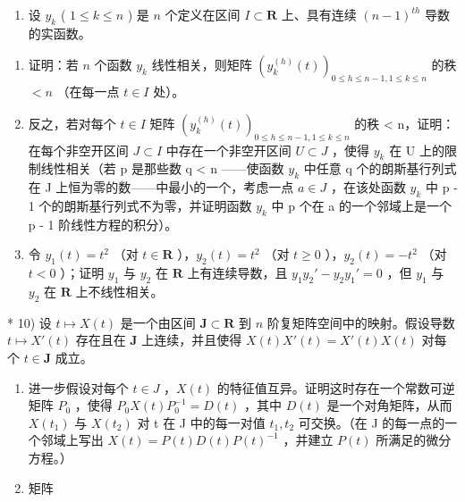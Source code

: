 \begin{enumerate}
\def\labelenumi{\arabic{enumi})}
\setcounter{enumi}{8}
\tightlist
\item
  设 \(y_{k}\) ( \(1 \leqslant k \leqslant n\) ) 是 \(n\) 个定义在区间 \(I \subset \mathbf{R}\) 上、具有连续 \((n - 1)^{th}\) 导数的实函数。
\end{enumerate}

\begin{enumerate}
\def\labelenumi{\alph{enumi})}
\item
  证明：若 \(n\) 个函数 \(y_{k}\) 线性相关，则矩阵 \((y_{k}^{(h)}(t))_{0\leqslant h\leqslant n - 1, 1\leqslant k\leqslant n}\) 的秩 \(< n\) （在每一点 \(t\in I\) 处）。
\item
  反之，若对每个 \(t \in I\) 矩阵 \((y_{k}^{(h)}(t))_{0 \leqslant h \leqslant n-1, 1 \leqslant k \leqslant n}\) 的秩 \textless{} n，证明：在每个非空开区间 \(J \subset I\) 中存在一个非空开区间 \(U \subset J\) ，使得 \(y_{k}\) 在 U 上的限制线性相关（若 p 是那些数 q \textless{} n ——使函数 \(y_{k}\) 中任意 q 个的朗斯基行列式在 J 上恒为零的数——中最小的一个，考虑一点 \(a \in J\) ，在该处函数 \(y_{k}\) 中 p - 1 个的朗斯基行列式不为零，并证明函数 \(y_{k}\) 中 p 个在 a 的一个邻域上是一个 p - 1 阶线性方程的积分）。
\item
  令 \(y_{1}(t) = t^{2}\) （对 \(t \in \mathbf{R}\) ），\(y_{2}(t) = t^{2}\) （对 \(t \geqslant 0\) ），\(y_{2}(t) = -t^{2}\) （对 \(t < 0\) ）；证明 \(y_{1}\) 与 \(y_{2}\) 在 \(\mathbf{R}\) 上有连续导数，且 \(y_{1}y_{2}' - y_{2}y_{1}' = 0\) ，但 \(y_{1}\) 与 \(y_{2}\) 在 \(\mathbf{R}\) 上不线性相关。
\end{enumerate}

* 10) 设 \(t \mapsto X(t)\) 是一个由区间 \(\mathbf{J} \subset \mathbf{R}\) 到 \(n\) 阶复矩阵空间中的映射。假设导数 \(t \mapsto X'(t)\) 存在且在 \(\mathbf{J}\) 上连续，并且使得 \(X(t)X'(t) = X'(t)X(t)\) 对每个 \(t \in \mathbf{J}\) 成立。

\begin{enumerate}
\def\labelenumi{\alph{enumi})}
\item
  进一步假设对每个 \(t \in J\) ，\(X(t)\) 的特征值互异。证明这时存在一个常数可逆矩阵 \(P_{0}\) ，使得 \(P_{0}X(t)P_{0}^{-1} = D(t)\) ，其中 \(D(t)\) 是一个对角矩阵，从而 \(X(t_{1})\) 与 \(X(t_{2})\) 对 t 在 J 中的每一对值 \(t_{1}, t_{2}\) 可交换。（在 J 的每一点的一个邻域上写出 \(X(t) = P(t)D(t)P(t)^{-1}\) ，并建立 \(P(t)\) 所满足的微分方程。）
\item
  矩阵
\end{enumerate}

